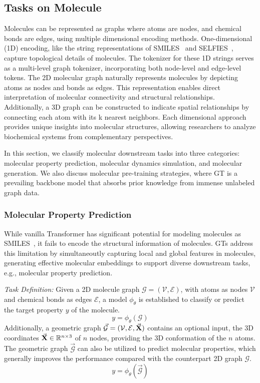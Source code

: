 \subsection{Tasks on Molecule}
\label{sec:application-mol}
Molecules can be represented as graphs where atoms are nodes, and chemical bonds are edges, using multiple dimensional encoding methods. One-dimensional (1D) encoding, like the string representations of SMILES~\cite{weininger1989smiles} and SELFIES~\cite{krenn2020self}, capture topological details of molecules. The tokenizer for these 1D strings serves as a multi-level graph tokenizer, incorporating both node-level and edge-level tokens. The 2D molecular graph naturally represents molecules by depicting atoms as nodes and bonds as edges. 
This representation enables direct interpretation of molecular connectivity and structural relationships. 
Additionally, a 3D graph can be constructed to indicate spatial relationships by connecting each atom with its k nearest neighbors.
Each dimensional approach provides unique insights into molecular structures, allowing researchers to analyze biochemical systems from complementary perspectives. 

In this section, we classify molecular downstream tasks into three categories: molecular property prediction, molecular dynamics simulation, and molecular generation. We also discuss molecular pre-training strategies, where GT is a prevailing backbone model that absorbs prior knowledge from immense unlabeled graph data.


\subsubsection{\textbf{Molecular Property Prediction}}
While vanilla Transformer has significant potential for modeling molecules as SMILES~\cite{weininger1989smiles}, it fails to encode the structural information of molecules. 
GTs address this limitation by simultaneoutly capturing local and global features in molecules, generating effective molecular embeddings to support diverse downstream tasks, e.g., molecular property prediction.

\textit{Task Definition:}
Given a 2D molecule graph $\mathcal G = (\mathcal V, \mathcal E)$, with atoms as nodes $\mathcal V$ and chemical bonds as edges $\mathcal E$, a model $\phi_{\theta}$ is established to classify or predict the target property $y$ of the molecule.
\begin{equation}
    y = \phi_{\theta}(\mathcal G)
\end{equation}
Additionally, a geometric graph $\mathcal{\vec{G}} = (\mathcal V, \mathcal E, \vec{\mathbf{X}})$ contains an optional input, the 3D coordinates $\vec{\mathbf{X}} \in \mathbb{R}^{n \times 3}$ of $n$ nodes, providing the 3D conformation of the $n$ atoms. 
The geometric graph $\mathcal{\vec{G}}$ can also be utilized to predict molecular properties, which generally improves the performance compared with the counterpart 2D graph $\mathcal{G}$.
\begin{equation}
    y = \phi_{\theta}(\mathcal{\vec{G}})
\end{equation}

